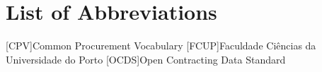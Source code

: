 \chapter*{List of Abbreviations}
\label{chap:abbreviations}

\begin{multicols}{2}[]
	\begin{scriptsize}
        	\begin{acronym}
        		    [CPV]{Common Procurement Vocabulary}
        		    {Faculdade Ciências da Universidade do Porto}
                    [OCDS]{Open Contracting Data Standard}
                    		\end{acronym}
	\end{scriptsize}
\end{multicols}
\clearemptydoublepage

